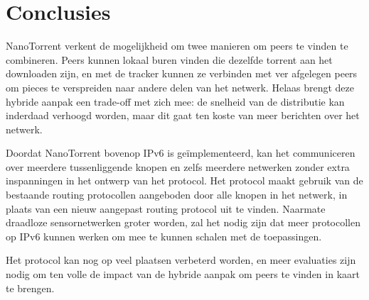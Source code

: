 \documentclass[journal]{IEEEtran}
\begin{document}
\section{Conclusies}
\label{sec:conclusies}
NanoTorrent verkent de mogelijkheid om twee manieren om peers te vinden te combineren. Peers kunnen lokaal buren vinden die dezelfde torrent aan het downloaden zijn, en met de tracker kunnen ze verbinden met ver afgelegen peers om pieces te verspreiden naar andere delen van het netwerk. Helaas brengt deze hybride aanpak een trade-off met zich mee: de snelheid van de distributie kan inderdaad verhoogd worden, maar dit gaat ten koste van meer berichten over het netwerk.

Doordat NanoTorrent bovenop IPv6 is ge\"implementeerd, kan het communiceren over meerdere tussenliggende knopen en zelfs meerdere netwerken zonder extra inspanningen in het ontwerp van het protocol. Het protocol maakt gebruik van de bestaande routing protocollen aangeboden door alle knopen in het netwerk, in plaats van een nieuw aangepast routing protocol uit te vinden. Naarmate draadloze sensornetwerken groter worden, zal het nodig zijn dat meer protocollen op IPv6 kunnen werken om mee te kunnen schalen met de toepassingen.

Het protocol kan nog op veel plaatsen verbeterd worden, en meer evaluaties zijn nodig om ten volle de impact van de hybride aanpak om peers te vinden in kaart te brengen.

%
%
\end{document}

